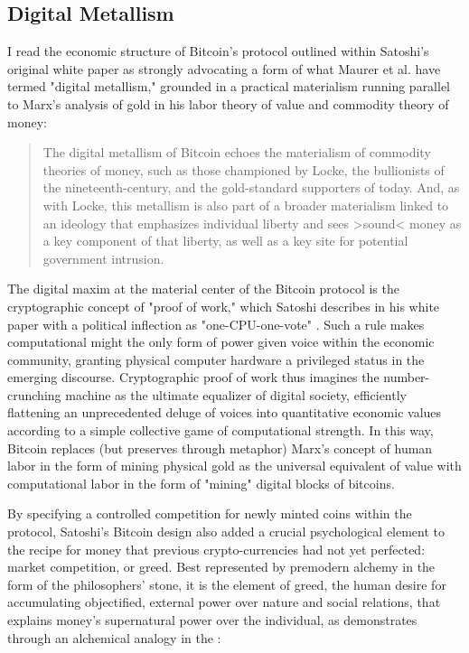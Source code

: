 \subsection*{Digital Metallism}
I read the economic structure of Bitcoin's protocol outlined within Satoshi's original white paper as strongly advocating a form of what Maurer et al. have termed "digital metallism," grounded in a practical materialism running parallel to Marx's analysis of gold in his labor theory of value and commodity theory of money:
\blockcquote[13]{Maurer2013}{
  The digital metallism of Bitcoin echoes the materialism of commodity theories of money, such as those championed by Locke, the bullionists of the nineteenth-century, and the gold-standard supporters of today. And, as with Locke, this metallism is also part of a broader materialism linked to an ideology that emphasizes individual liberty and sees >sound< money as a key component of that liberty, as well as a key site for potential government intrusion.
}
The digital maxim at the material center of the Bitcoin protocol is the cryptographic concept of "proof of work," which Satoshi describes in his white paper with a political inflection as "one-CPU-one-vote" \autocite*[3]{Nakamoto2008}. Such a rule makes computational might the only form of power given voice within the economic community, granting physical computer hardware a privileged status in the emerging discourse. Cryptographic proof of work thus imagines the number-crunching machine as the ultimate equalizer of digital society, efficiently flattening an unprecedented deluge of voices into quantitative economic values according to a simple collective game of computational strength. In this way, Bitcoin replaces (but preserves through metaphor) Marx's concept of human labor in the form of mining physical gold as the universal equivalent of value with computational labor in the form of "mining" digital blocks of bitcoins.

By specifying a controlled competition for newly minted coins within the protocol, Satoshi's Bitcoin design also added a crucial psychological element to the recipe for money that previous crypto-currencies had not yet perfected: market competition, or greed. Best represented by premodern alchemy in the form of the philosophers' stone, it is the element of greed, the human desire for accumulating objectified, external power over nature and social relations, that explains money's supernatural power over the individual, as \citeauthor{MarxGrundrisse} demonstrates through an alchemical analogy in the :

